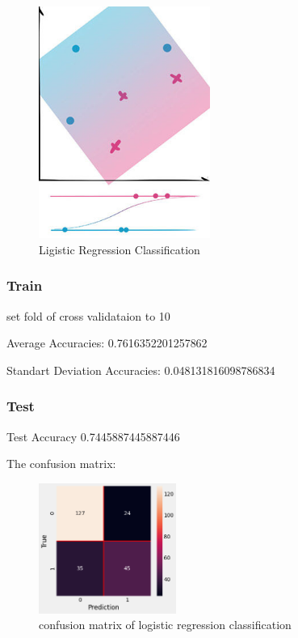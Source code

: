 \documentclass[11pt,en]{elegantpaper}
\begin{document}
\begin{figure}[H]
    \centering
    \includegraphics[width=0.5\textwidth]{figure/lr-model.jpg}
    \caption{Ligistic Regression Classification}
\end{figure}

\subsubsection{Train}
set fold of cross validataion to 10

Average Accuracies:  0.7616352201257862

Standart Deviation Accuracies:  0.048131816098786834

\subsubsection{Test}
Test Accuracy 0.7445887445887446

The confusion matrix:
\begin{figure}[H]
    \centering
    \includegraphics[width=0.4\textwidth]{figure/conmat-lr.png}
    \caption{confusion matrix of logistic regression classification}
\end{figure}
\end{document}
